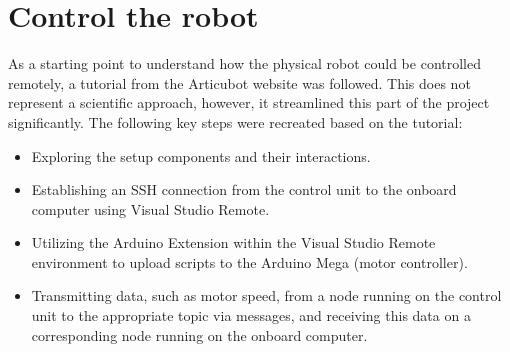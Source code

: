 \section{Control the robot}


As a starting point to understand how the physical robot could be controlled remotely, a tutorial from the Articubot website was followed. This does not represent a scientific approach, however, it streamlined this part of the project significantly. The following key steps were recreated based on the tutorial:

\begin{itemize}
    \item Exploring the setup components and their interactions.
    \item Establishing an SSH connection from the control unit to the onboard computer using Visual Studio Remote.
    \item Utilizing the Arduino Extension within the Visual Studio Remote environment to upload scripts to the Arduino Mega (motor controller).
    \item Transmitting data, such as motor speed, from a node running on the control unit to the appropriate topic via messages, and receiving this data on a corresponding node running on the onboard computer.
\end{itemize}
